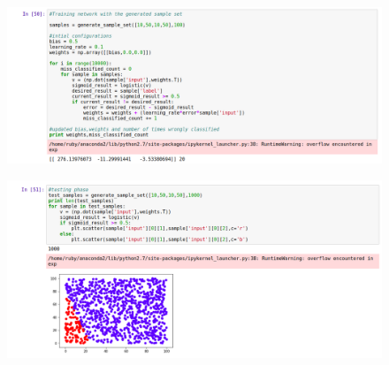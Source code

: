 \documentclass[12pt]{article}
\begin{document}
 \begin{figure}[H]
	\centering
	\includegraphics[scale=0.40]{ex3_2.png}
\end{figure}

 \begin{figure}[H]
	\centering
	\includegraphics[scale=0.40]{ex3_3.png}
\end{figure}
\newpage


\end{document}
